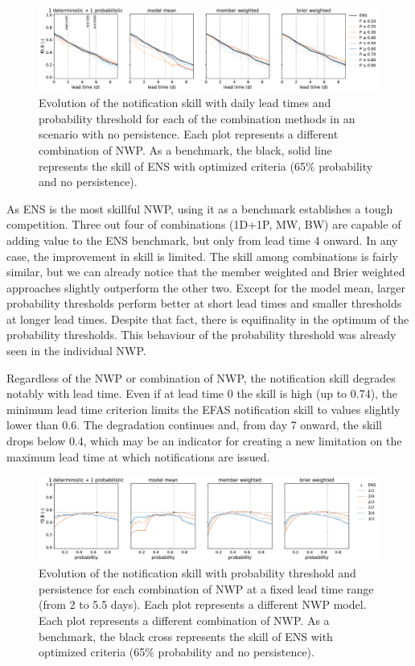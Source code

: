 \documentclass[preprint,12pt,authoryear]{elsarticle}
\begin{document}
\begin{figure}
    \centering
    \includegraphics[width=1\textwidth]{figures/skill_probability_leadtime_1-1_COMB_vs_ENS.pdf}
    \caption{Evolution of the notification skill with daily lead times and probability threshold for each of the combination methods in an scenario with no persistence. Each plot represents a different combination of NWP. As a benchmark, the black, solid line represents the skill of ENS with optimized criteria (65\% probability and no persistence).}
    \label{fig:COMB_skill_leadtime}
\end{figure}

As ENS is the most skillful NWP, using it as a benchmark establishes  a tough competition. Three out four of combinations (1D+1P, MW, BW) are capable of adding value to the ENS benchmark, but only from lead time 4 onward. In any case, the improvement in skill is limited. The skill among combinations is fairly similar, but we can already notice that the member weighted  and Brier weighted  approaches slightly outperform the other two. Except for the model mean, larger probability thresholds perform better at short lead times and smaller thresholds at longer lead times. Despite that fact, there is equifinality in the optimum of the probability thresholds. This behaviour of the probability threshold was already seen in the individual NWP.

Regardless of the NWP or combination of NWP, the notification skill degrades notably with lead time. Even if at lead time 0 the skill is high (up to 0.74), the minimum lead time criterion limits the EFAS notification skill to values slightly lower than 0.6. The degradation continues and, from day 7 onward, the skill drops below 0.4, which may be an indicator for creating a new limitation on the maximum lead time at which notifications are issued.

\begin{figure}
    \centering
    \includegraphics[width=1\textwidth]{figures/skill_persistence_probability_060h_COMB_vs_ENS.pdf}
    \caption{Evolution of the notification skill with probability threshold and persistence  for each combination of NWP at a fixed lead time range (from 2 to 5.5 days). Each plot represents a different NWP model. Each plot represents a different combination of NWP. As a benchmark, the black cross represents the skill of ENS with optimized criteria (65\% probability and no persistence).}
    \label{fig:COMB_skill_probability}
\end{figure}
\end{document}
